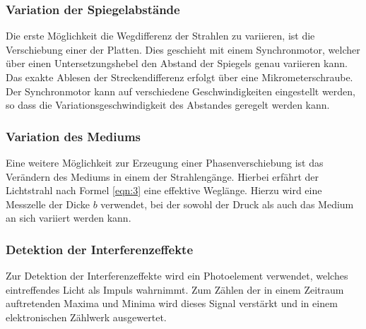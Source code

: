 \subsubsection{Variation der Spiegelabstände}
Die erste Möglichkeit die Wegdifferenz der Strahlen zu variieren, ist die Verschiebung einer der Platten.
Dies geschieht mit einem Synchronmotor, welcher über einen Untersetzungshebel den Abstand der Spiegels genau variieren kann.
Das exakte Ablesen der Streckendifferenz erfolgt über eine Mikrometerschraube.
Der Synchronmotor kann auf verschiedene Geschwindigkeiten eingestellt werden, so dass die Variationsgeschwindigkeit des Abstandes geregelt werden kann.

\subsubsection{Variation des Mediums}
Eine weitere Möglichkeit zur Erzeugung einer Phasenverschiebung ist das Verändern des Mediums in einem der Strahlengänge.
Hierbei erfährt der Lichtstrahl nach Formel \eqref{eqn:3} eine effektive Weglänge.
Hierzu wird eine Messzelle der Dicke $b$ verwendet, bei der sowohl der Druck als auch das Medium an sich variiert werden kann.

\subsubsection{Detektion der Interferenzeffekte}
Zur Detektion der Interferenzeffekte wird ein Photoelement verwendet, welches eintreffendes Licht als Impuls wahrnimmt.
Zum Zählen der in einem Zeitraum auftretenden Maxima und Minima wird dieses Signal verstärkt und in einem elektronischen Zählwerk ausgewertet.

